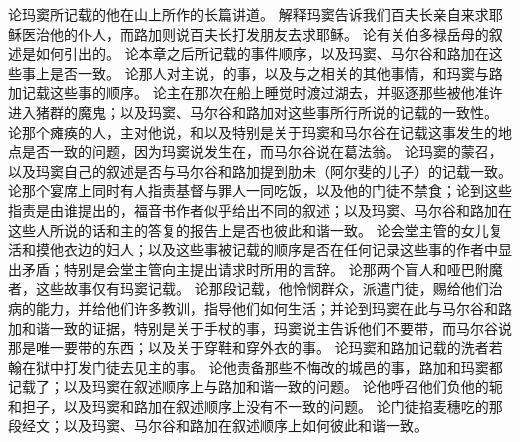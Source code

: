 论玛窦所记载的他在山上所作的长篇讲道。\newline{} 解释玛窦告诉我们百夫长亲自来求耶稣医治他的仆人，而路加则说百夫长打发朋友去求耶稣。\newline{} 论有关伯多禄岳母的叙述是如何引出的。\newline{} 论本章之后所记载的事件顺序，以及玛窦、马尔谷和路加在这些事上是否一致。\newline{} 论那人对主说，的事，以及与之相关的其他事情，和玛窦与路加记载这些事的顺序。\newline{} 论主在那次在船上睡觉时渡过湖去，并驱逐那些被他准许进入猪群的魔鬼；以及玛窦、马尔谷和路加对这些事所行所说的记载的一致性。\newline{} 论那个瘫痪的人，主对他说，和以及特别是关于玛窦和马尔谷在记载这事发生的地点是否一致的问题，因为玛窦说发生在，而马尔谷说在葛法翁。\newline{} 论玛窦的蒙召，以及玛窦自己的叙述是否与马尔谷和路加提到肋未（阿尔斐的儿子）的记载一致。\newline{} 论那个宴席上同时有人指责基督与罪人一同吃饭，以及他的门徒不禁食；论到这些指责是由谁提出的，福音书作者似乎给出不同的叙述；以及玛窦、马尔谷和路加在这些人所说的话和主的答复的报告上是否也彼此和谐一致。\newline{} 论会堂主管的女儿复活和摸他衣边的妇人；以及这些事被记载的顺序是否在任何记录这些事的作者中显出矛盾；特别是会堂主管向主提出请求时所用的言辞。\newline{} 论那两个盲人和哑巴附魔者，这些故事仅有玛窦记载。\newline{} 论那段记载，他怜悯群众，派遣门徒，赐给他们治病的能力，并给他们许多教训，指导他们如何生活；并论到玛窦在此与马尔谷和路加和谐一致的证据，特别是关于手杖的事，玛窦说主告诉他们不要带，而马尔谷说那是唯一要带的东西；以及关于穿鞋和穿外衣的事。\newline{} 论玛窦和路加记载的洗者若翰在狱中打发门徒去见主的事。\newline{} 论他责备那些不悔改的城邑的事，路加和玛窦都记载了；以及玛窦在叙述顺序上与路加和谐一致的问题。\newline{} 论他呼召他们负他的轭和担子，以及玛窦和路加在叙述顺序上没有不一致的问题。\newline{} 论门徒掐麦穗吃的那段经文；以及玛窦、马尔谷和路加在叙述顺序上如何彼此和谐一致。\newline{} 